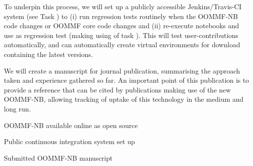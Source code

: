 \begin{workpackage}[id=dissem,wphases=18-48!.5,
  title=Dissemination,
  SARM=1,
  USORM=7]
\begin{tasklist}
\begin{task}[id=dissemination-of-oommf-nb-virtual-environment,
  title=Dissemination of OOMMF-NB virtual environment]
  To underpin this process, we will set up a publicly accessible Jenkins/Travis-CI system
  (see Task ) to (i) run regression tests routinely when the
  OOMMF-NB code changes or OOMMF core code changes and (ii) re-execute notebooks and use
  as regression test (making using of task ). This will
  test user-contributions automatically, and can automatically create virtual environments
  for download containing the latest versions.

  We will create a manuscript for journal publication, summarising the
  approach taken and experience gathered so far. An important point of
  this publication is to provide a reference that can be cited by
  publications making use of the new OOMMF-NB, allowing tracking of
  uptake of this technology in the medium and long run.
\end{task}
\end{tasklist}

\begin{wpdelivs}
  \begin{wpdeliv}[due=15,id=OOMMF-NB-opensource,dissem=??,nature=??]
      {OOMMF-NB available online as open source}
\end{wpdeliv}
  \begin{wpdeliv}[due=18,id=OOMMF-NB-opensource-testing,dissem=??,nature=??]
      {Public continuous integration system set up}
\end{wpdeliv}
  \begin{wpdeliv}[due=36,id=OOMMF-NB-opensource-manuscript,dissem=??,nature=??]
      {Submitted OOMMF-NB manuscript}
\end{wpdeliv}

\end{wpdelivs}


\end{workpackage}
